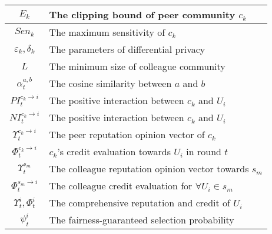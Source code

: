 \documentclass[lettersize,journal]{IEEEtran}
\begin{document}
\begin{table}[!t]
{\begin{tabular}{| c || l |}
    \hline
    $E_k$ & The clipping bound of peer community $c_k$\\
    \hline
    $Sen_k$ & The maximum sensitivity of $c_k$\\
    \hline
    $\varepsilon_k,\delta_k$& The parameters of differential privacy \\
    \hline
    $L$& The minimum size of colleague community\\
    \hline
    $\alpha^{a,b}_{t}$& The cosine similarity between $a$ and $b$\\
    \hline
    $PI^{c_k \rightarrow i}_{t}$ & The positive interaction between $c_k$ and $U_i$\\
    \hline
    $NI^{c_k \rightarrow i}_{t}$& The positive interaction between $c_k$ and $U_i$\\
    \hline
    $\Upsilon^{c_k \rightarrow i}_{t}$& The peer reputation opinion vector of $c_k$\\
    \hline
    $\Phi^{c_k \rightarrow i}_{t}$& $c_k$'s credit evaluation towards $U_i$ in round $t$\\
    \hline
    $\Upsilon^{s_m}_{t}$ & The colleague reputation opinion vector towards $s_m$\\
    \hline
    $\Phi^{s_m \rightarrow i}_{t}$& The colleague credit evaluation for $\forall U_i \in s_m$\\
    \hline
    $\Upsilon^{i}_{t},\Phi^{i}_{t}$& The comprehensive reputation and credit of $U_i$\\
    \hline
    $\psi^{i}_t$& The fairness-guaranteed selection probability\\
    \hline
    \end{tabular}
        }
     \vspace{-1.5em}
     \end{table}
     
\end{document}
